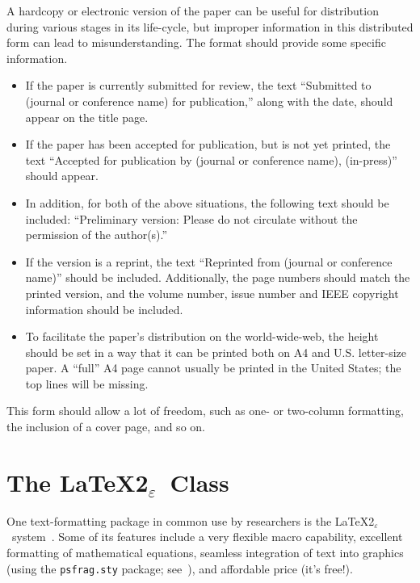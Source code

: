 \documentclass[%
	final,
	notitlepage,
	narroweqnarray,
	inline,
	twoside,
	]{ieee}
\newcommand{\latexiie}{\LaTeX2{\Large$_\varepsilon$}}
\begin{document}
A hardcopy or electronic version of the paper can be useful for
distribution during various stages in its life-cycle, but improper
information in this distributed form can lead to misunderstanding.
The format should provide some specific information.
\begin{itemize}
\item If the paper is currently submitted for review, the
      text ``Submitted to (journal or conference name) for
      publication,'' along with the date, should appear on the title
      page.  
\item If the paper has been accepted for publication, but is not
      yet printed, the text ``Accepted for publication by (journal or
      conference name), (in-press)'' should appear. 
\item In addition, for both of the above situations, the following text 
      should be included: ``Preliminary version: Please do not circulate 
      without the permission of the author(s).''
\item If the version is a reprint, the 
      text ``Reprinted from (journal or conference name)'' should be 
      included. Additionally, the page numbers should match the printed
      version, and the volume number, issue number and IEEE copyright 
      information should be included. 
\item To facilitate the paper's distribution on the world-wide-web,
      the height should be set 
      in a way that it can be printed both on A4 and U.S. letter-size paper. 
      A ``full'' A4 page cannot usually be printed in the United 
      States; the top lines will be missing. 
\end{itemize}
This form should allow a lot of freedom, such as one- or two-column
formatting, the inclusion of a cover page, and so on.

\section{The \latexiie\ Class}
\label{sec:latex}

One text-formatting package in common use by researchers is the
\latexiie\ system~\cite{lamport}. Some of its features include a very
flexible macro capability, excellent formatting of mathematical
equations, seamless integration of text into graphics (using the
\texttt{psfrag.sty} package; see~\cite{goossens}), and affordable
price (it's free!).
\end{document}
